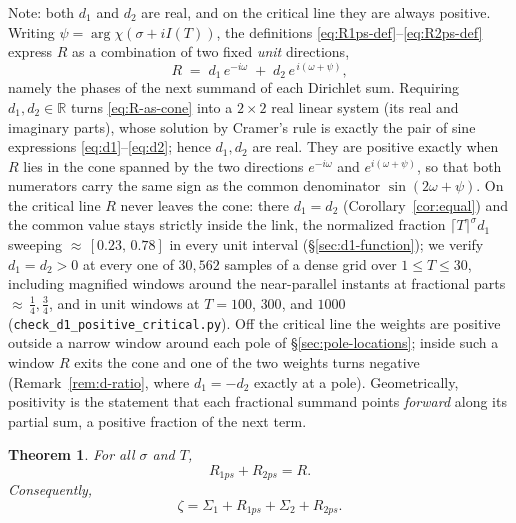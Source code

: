 \documentclass[11pt]{article}
\newtheorem{theorem}{Theorem}[section]
\theoremstyle{definition}
\begin{document}
Note: both $d_1$ and $d_2$ are real, and on the critical line they are always
positive. Writing $\psi=\arg\chi(\sigma+iI(T))$, the
definitions \eqref{eq:R1ps-def}--\eqref{eq:R2ps-def} express $R$ as a combination
of two fixed \emph{unit} directions,
\begin{equation}\label{eq:R-as-cone}
R \;=\; d_1\,e^{-i\omega} \;+\; d_2\,e^{\,i(\omega+\psi)},
\end{equation}
namely the phases of the next summand of each Dirichlet sum. Requiring
$d_1,d_2\in\mathbb{R}$ turns \eqref{eq:R-as-cone} into a $2\times2$ real linear
system (its real and imaginary parts), whose solution by Cramer's rule is exactly
the pair of sine expressions \eqref{eq:d1}--\eqref{eq:d2}; hence $d_1,d_2$ are
real. They are positive exactly when $R$ lies in the cone spanned by the two
directions $e^{-i\omega}$ and $e^{i(\omega+\psi)}$, so that both numerators carry the
same sign as the common denominator $\sin(2\omega+\psi)$. On the critical line
$R$ never leaves the cone: there $d_1=d_2$ (Corollary~\ref{cor:equal}) and the
common value stays strictly inside the link, the normalized fraction
$\lceil T\rceil^{\sigma}d_1$ sweeping ${\approx}\,[0.23,\,0.78]$ in every unit
interval (\S\ref{sec:d1-function}); we verify $d_1=d_2>0$ at every one of
$30{,}562$ samples of a dense grid over $1\le T\le30$, including magnified
windows around the near-parallel instants at fractional parts
${\approx}\,\tfrac14,\tfrac34$, and in unit windows at $T=100$, $300$, and
$1000$ (\texttt{check\_d1\_positive\_critical.py}). Off the critical line the
weights are positive outside a narrow window around each pole of
\S\ref{sec:pole-locations}; inside such a window $R$ exits the cone and one of
the two weights turns negative (Remark~\ref{rem:d-ratio}, where $d_1=-d_2$
exactly at a pole). Geometrically, positivity is the statement that each
fractional summand points \emph{forward} along its
partial sum, a positive fraction of the next term.

\begin{theorem}\label{thm:decomp}
For all $\sigma$ and $T$,
\[
R_{1ps} + R_{2ps} = R.
\]
Consequently,
\[
\zeta = \Sigma_{1} + R_{1ps} + \Sigma_{2} + R_{2ps}.
\]
\end{theorem}
\end{document}
